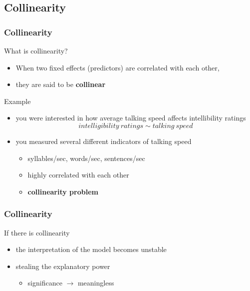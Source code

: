 \documentclass[10p]{beamer}\usepackage[]{graphicx}\usepackage[]{color}
\begin{document}
\subsection{Collinearity}
\begin{frame}
\frametitle{Collinearity}
What is collinearity?
\begin{itemize}
\item When two fixed effects (predictors) are \alert{correlated with} each other,
\item they are said to be \textbf{collinear}
\end{itemize}

Example
\begin{itemize}
\item you were interested in how average talking speed affects intellibility ratings
\begin{displaymath}
intelligibility\ ratings \sim talking\ speed
\end{displaymath}
\item you measured several different indicators of talking speed
	\begin{itemize}
	\item syllables/sec, words/sec, sentences/sec
  \item highly correlated with each other
  \item \textbf{collinearity problem}
  \end{itemize}
\end{itemize}
\end{frame}

\begin{frame}
\frametitle{Collinearity}
If there is collinearity
\begin{itemize}
\item the interpretation of the model becomes \alert{unstable}
\item stealing the explanatory power
\begin{itemize}
\item significance $\rightarrow$ meaningless
\end{itemize}
\end{itemize}
\end{frame}
\end{document}
